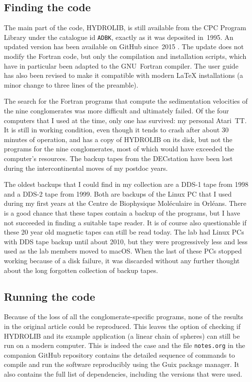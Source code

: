\subsection*{Finding the code}

The main part of the code, HYDROLIB, is still available from the CPC Program Library \cite{CPCInternationalProgram2016} under the catalogue id \texttt{ADBK}, exactly as it was deposited in~1995. An updated version has been available on GitHub since~2015 \cite{HinsenHYDROLIBsourcecode2019}. The update does not modify the Fortran code, but only the compilation and installation scripts, which have in particular been adapted to the GNU~Fortran compiler. The user guide has also been revised to make it compatible with modern LaTeX installations (a minor change to three lines of the preamble).

The search for the Fortran programs that compute the sedimentation velocities of the nine conglomerates was more difficult and ultimately failed. Of the four computers that I used at the time, only one has survived: my personal Atari~TT. It is still in working condition, even though it tends to crash after about 30 minutes of operation, and has a copy of HYDROLIB on its disk, but not the programs for the nine conglomerates, most of which would have exceeded the computer's resources. The backup tapes from the DECstation have been lost during the intercontinental moves of my postdoc years.

The oldest backups that I could find in my collection are a DDS-1 tape from 1998 and a DDS-2 tape from 1999. Both are backups of the Linux PC that I used during my first years at the Centre de Biophysique Moléculaire in Orléans. There is a good chance that these tapes contain a backup of the programs, but I have not succeeded in finding a suitable tape reader. It is of course also questionable if these 20 year old magnetic tapes can still be read today. The lab had Linux PCs with DDS tape backup until about 2010, but they were progressively less and less used as the lab members moved to macOS. When the last of these PCs stopped working because of a disk failure, it was discarded without any further thought about the long forgotten collection of backup tapes.

\subsection*{Running the code}

Because of the loss of all the conglomerate-specific programs, none of the results in the original article could be reproduced. This leaves the option of checking if HYDROLIB and its example application (a linear chain of spheres) can still be run on a modern computer. This is indeed the case and the file \texttt{notes.org} in the companion GitHub repository contains the detailed sequence of commands to compile and run the software reproducibly using the Guix package manager. It also contains the full list of dependencies, including the versions that were used.

